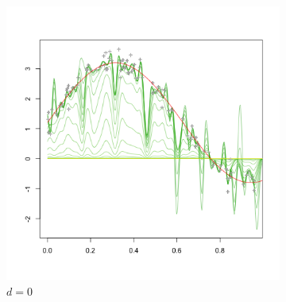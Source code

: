 \begin{figure}[H]
\caption{\textit{Illustration of the impact of the order of the difference penalty. The number of B-splines used is the same in each plot, with the penalty parameter varying from across the same grid of values. The fitted curves in the upper left plot correspond to the difference penalty of order $0$, where $\vert D_0 \theta \vert^2 = \sum_{i} \theta_i^2$, analogous to ridge regression using the B-spline basis as regression covariates. The fitted curves approach polynomials of degree $d-1$ as $\lambda \rightarrow \infty$.}} \label{fig:PS-difference-order-demo}
\begin{subfigure}{.5\textwidth}
  \centering
   \graphicspath{{img/}}
  \includegraphics[scale=0.5]{PS_penalty_section_figure_6_order_0.png}
\caption{$d=0$ }
\end{subfigure}
\begin{subfigure}{.5\textwidth}
  \centering
   \graphicspath{{img/}}

\end{subfigure}
\end{figure}
